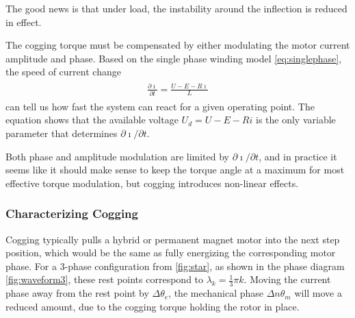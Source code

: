 \documentclass[12pt,a4paper,oneside,openany]{article}
\begin{document}
The good news is that under load, the instability around the inflection is reduced in effect.

The cogging torque must be compensated by either modulating the motor current amplitude and phase. Based on the single phase winding model \cref{eq:singlephase}, the speed of current change
\begin{gather}
\begin{aligned}
\label{eq:didt-winding} 
\frac{\partial \imath}{\partial t} = \frac{U - E - R \imath}{L}
\end{aligned}
\end{gather}
can tell us how fast the system can react for a given operating point. The equation shows that the available voltage $U_d = U - E - R i$ is the only variable parameter that determines ${\partial \imath} / {\partial t}$.

Both phase and amplitude modulation are limited by ${\partial \imath} / {\partial t}$, and in practice it seems like it should make sense to keep the torque angle at a maximum for most effective torque modulation, but cogging introduces non-linear effects. 

\subsubsection{Characterizing Cogging}

Cogging typically pulls a hybrid or permanent magnet motor into the next step position, which would be the same as fully energizing the corresponding motor phase. For a 3-phase configuration from \cref{fig:star}, as shown in the phase diagram \cref{fig:waveform3}, these rest points correspond to $\lambda_k = \frac{1}{3}\pi k$. Moving the current phase away from the rest point by $\Delta \theta_e$, the mechanical phase $\Delta n\theta_m$ will move a reduced amount, due to the cogging torque holding the rotor in place.
\end{document}
